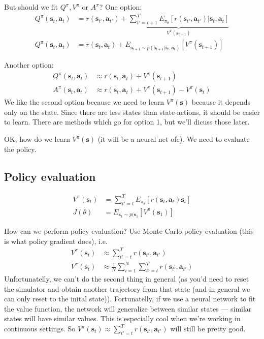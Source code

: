\documentclass{report}
\begin{document}
But should we fit $Q^\pi, V^\pi$ or $A^\pi$?
One option:
\begin{align}
Q^\pi (\bm{s}_{t}, \bm{a}_{t})  &= r(\bm{s}_{t'}, \bm{a}_{t'}) + \underbrace{\sum_{t'=t+1}^{T} E_{\pi_\theta} \left[ r(\bm{s}_{t'}, \bm{a}_{t'})|\bm{s}_t, \bm{a}_t \right]}_{V^\pi(\bm{s}_{t+1})} \\
Q^\pi (\bm{s}_{t}, \bm{a}_{t})  &= r(\bm{s}_{t}, \bm{a}_{t}) + E_{\bm{s}_{t+1} \sim p(\bm{s}_{t+1}|\bm{s}_t, \bm{a}_t)} \left[ V^\pi (\bm{s}_{t+1}) \right] 
\end{align}

Another option:
\begin{align}
		Q^\pi (\bm{s}_{t}, \bm{a}_{t})  &\approx r(\bm{s}_{t}, \bm{a}_{t}) + V^\pi (\bm{s}_{t+1}) \\
		A^\pi (\bm{s}_{t}, \bm{a}_{t})  &\approx r(\bm{s}_{t}, \bm{a}_{t}) + V^\pi (\bm{s}_{t+1})  - V^\pi(\bm{s}_t)
\end{align}
We like the second option because we need to learn $V^\pi(\bm{s})$ because it depends only on the state.
Since there are less states than state-actions, it should be easier to learn.
There are methods which go for option 1, but we'll dicuss those later.

OK, how do we learn $V^\pi(\bm{s})$ (it will be a neural net ofc).
We need to evaluate the policy.

\subsection{Policy evaluation}
\begin{align}
		V^\pi(\bm{s}_t) &= \sum_{t'=t}^{T} E_{\pi_\theta} \left[ r(\bm{s}_{t}, \bm{a}_{t})\bm{s}_t \right] \\
		J(\theta) &= E_{\bm{s}_1 \sim p(\bm{s}_1} \left[ V^\pi (\bm{s}_1) \right] 
\end{align}

How can we perform policy evaluation? 
Use Monte Carlo policy evaluation (this is what policy gradient does), i.e.
\begin{align}
		V^\pi (\bm{s}_t) &\approx \sum_{t'=t}^{T} r(\bm{s}_{t'}, \bm{a}_{t'})\\
V^\pi (\bm{s}_t) &\approx \frac{1}{N} \sum_{i=1}^{N} \sum_{t'=t}^{T} r(\bm{s}_{t'}, \bm{a}_{t'})
\end{align}
Unfortunatelly, we can't do the second thing in general (as you'd need to reset the simulator and obtain 
another trajectory from that state (and in general we can only reset to the inital state)).
Fortunatelly, if we use a neural network to fit the value function, the network will generalize between similar states ---
similar states will have similar values. This is especially cool when we're working in continuous settings.
So $V^\pi (\bm{s}_t) \approx \sum_{t'=t}^{T} r(\bm{s}_{t'}, \bm{a}_{t'})$ will still be pretty good.
\end{document}
